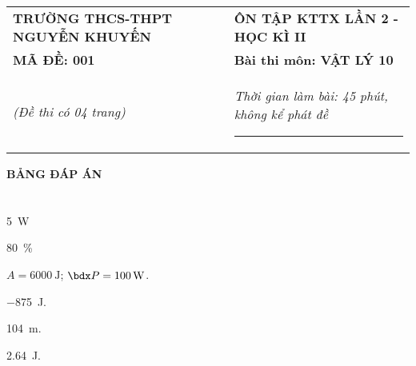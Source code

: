 \begin{center}
	\begin{tabular}{M{9.25cm}M{8.75cm}}
		\textbf{TRƯỜNG THCS-THPT NGUYỄN KHUYẾN}& \textbf{ÔN TẬP KTTX LẦN 2 - HỌC KÌ II}\\
		\textbf{MÃ ĐỀ: 001}& \textbf{Bài thi môn: VẬT LÝ 10}\\
		\textit{(Đề thi có 04 trang)}& \textit{Thời gian làm bài: 45 phút, không kể phát đề}
		
		\noindent\rule{4cm}{0.8pt} \\
	\end{tabular}
\end{center}
\setcounter{section}{0}
\begin{center}
	\textbf{\large BẢNG ĐÁP ÁN}
\end{center}
\section{}
\section{}
\section{}
\setcounter{ex}{0}
\begin{ex}
	\SI{5}{\watt}
	\loigiai{
		
	}
\end{ex}
\begin{ex}
	\SI{80}{\percent}
	\loigiai{
		
	}
\end{ex}
\begin{ex}
	$A=\SI{6000}{\joule}$; $\calP=\SI{100}{\watt}$.
	\loigiai{
		
	}
\end{ex}
\begin{ex}
	\SI{-875}{\joule}.
	\loigiai{
		
	}
\end{ex}
\begin{ex}
		\SI{104}{\meter}.
	\loigiai{
		
	}
\end{ex}
\begin{ex}
	\SI{2.64}{\joule}.
	\loigiai{
		
	}
\end{ex}